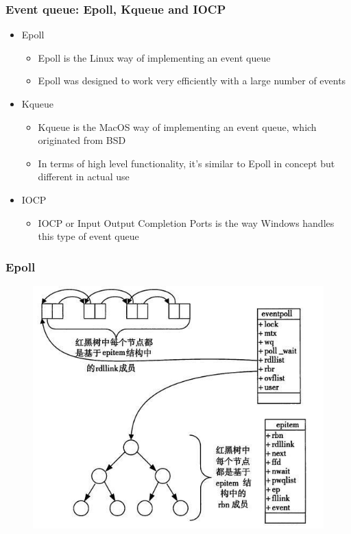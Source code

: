\begin{frame}[fragile]
    \frametitle{Event queue: Epoll, Kqueue and IOCP}
% 
% 
% 
    \begin{itemize}
        \item Epoll
    	\begin{itemize}
    	    \item Epoll is the Linux way of implementing an event queue
    	    \item Epoll was designed to work very efficiently with a large number of events
    	\end{itemize}
        \item Kqueue
    	\begin{itemize}
    	    \item Kqueue is the MacOS way of implementing an event queue, which originated from BSD
    	    \item In terms of high level functionality, it's similar to Epoll in concept but different in actual use
    	\end{itemize}
        \item IOCP
    	\begin{itemize}
    	    \item IOCP or Input Output Completion Ports is the way Windows handles this type of event queue
    	\end{itemize}
    \end{itemize}

\end{frame}
\begin{frame}[fragile]
    \frametitle{Epoll}
% 
% 
    \begin{figure}
    \includegraphics[width=0.8\linewidth]{figs/epoll.png}
    \end{figure}
% 
\end{frame}
